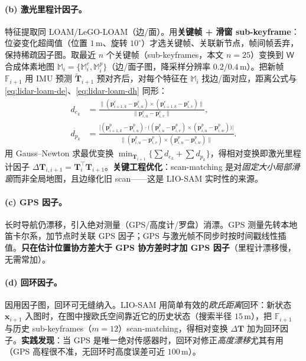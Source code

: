 \paragraph{(b) 激光里程计因子。}
特征提取同 LOAM/LeGO-LOAM（边/面）。用\textbf{关键帧 + 滑窗 sub-keyframe}\cite{shan2020liosam}：位姿变化超阈值（位置 $1$\,m、旋转 $10^\circ$）才选关键帧、关联新节点，帧间帧丢弃，保持稀疏因子图。取最近 $n$ 个关键帧（sub-keyframes，本文 $n{=}25$）变换到 $\mathsf{W}$ 合成体素地图 $\mathbb{M}_i=\{\mathbb{M}^e_i,\mathbb{M}^p_i\}$（边/面子图，降采样分辨率 $0.2$/$0.4$\,m）。把新帧 $\mathbb{F}_{i+1}$ 用 IMU 预测 $\tilde{\mathbf{T}}_{i+1}$ 预对齐后，对每个特征在 $\mathbb{M}_i$ 找边/面对应，距离公式与 \cref{eq:lidar-loam-de}、\cref{eq:lidar-loam-dh} 同形：
\begin{align}
  d_{e_k}&=\frac{\big\|(\mathbf{p}^e_{i+1,k}-\mathbf{p}^e_{i,u})\times(\mathbf{p}^e_{i+1,k}-\mathbf{p}^e_{i,v})\big\|}{\|\mathbf{p}^e_{i,u}-\mathbf{p}^e_{i,v}\|}, \label{eq:lidar-liosam-de}\\
  d_{p_k}&=\frac{\big|(\mathbf{p}^p_{i+1,k}-\mathbf{p}^p_{i,u})\cdot\big((\mathbf{p}^p_{i,u}-\mathbf{p}^p_{i,v})\times(\mathbf{p}^p_{i,u}-\mathbf{p}^p_{i,w})\big)\big|}{\big\|(\mathbf{p}^p_{i,u}-\mathbf{p}^p_{i,v})\times(\mathbf{p}^p_{i,u}-\mathbf{p}^p_{i,w})\big\|}. \label{eq:lidar-liosam-dp}
\end{align}
用 Gauss–Newton 求最优变换 $\min_{\mathbf{T}_{i+1}}\{\sum d_{e_k}+\sum d_{p_k}\}$，得相对变换即激光里程计因子 $\Delta\mathbf{T}_{i,i+1}=\mathbf{T}_i^\top\mathbf{T}_{i+1}$。\textbf{关键工程优化}：scan-matching 是对\emph{固定大小局部滑窗}而非全局地图，且边缘化旧 scan——这是 LIO-SAM 实时性的来源。

\paragraph{(c) GPS 因子。}
长时导航仍漂移，引入绝对测量（GPS/高度计/罗盘）消漂\cite{shan2020liosam}。GPS 测量先转本地笛卡尔系，加节点时关联 GPS 因子；GPS 与激光帧不同步时按时间戳线性插值。\textbf{只在估计位置协方差大于 GPS 协方差时才加 GPS 因子}（里程计漂移慢，无需常加）。

\paragraph{(d) 回环因子。}
因用因子图，回环可无缝纳入。LIO-SAM 用简单有效的\emph{欧氏距离}回环：新状态 $\mathbf{x}_{i+1}$ 入图时，在图中搜欧氏空间靠近它的历史状态（搜索半径 $15$\,m），把 $\mathbb{F}_{i+1}$ 与历史 sub-keyframes（$m{=}12$）scan-matching，得相对变换 $\Delta\mathbf{T}$ 加为回环因子。\textbf{实践发现}：当 GPS 是唯一绝对传感器时，回环对修正\emph{高度漂移}尤其有用（GPS 高程很不准，无回环时高度误差可近 $100$\,m）。

